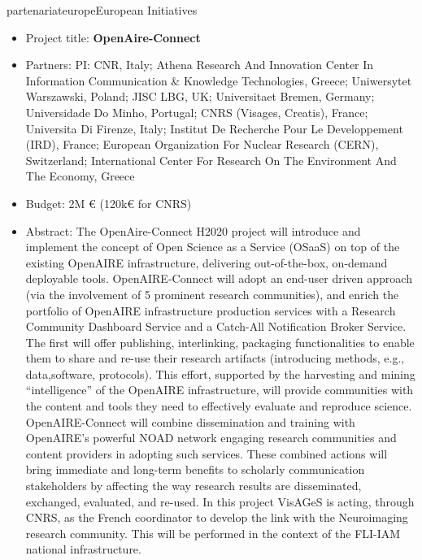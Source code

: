 \documentclass{ra2018}
\begin{document}
\begin{module}{partenariat}{europe}{European Initiatives}
\begin{itemize}
        \item Project title: \textbf{OpenAire-Connect}
        \item Partners: PI: CNR, Italy; Athena Research And Innovation Center In Information Communication \& Knowledge Technologies, Greece; Uniwersytet Warszawski, Poland; JISC LBG, UK; Universitaet Bremen, Germany; Universidade Do Minho, Portugal; CNRS (Visages, Creatis), France; Universita Di Firenze, Italy; Institut De Recherche Pour Le Developpement (IRD), France; European Organization For Nuclear Research (CERN), Switzerland; International Center For Research On The Environment And The Economy, Greece
        \item Budget: 2M € (120k€ for CNRS)
        \item Abstract:  The OpenAire-Connect H2020 project will introduce and implement the concept of Open Science as a Service (OSaaS) on top of the existing OpenAIRE infrastructure, delivering out-of-the-box, on-demand deployable tools. OpenAIRE-Connect will adopt an end-user driven approach (via the involvement of 5 prominent research communities), and enrich the portfolio of OpenAIRE infrastructure production services with a Research Community Dashboard Service and a Catch-All Notification Broker Service. The first will offer publishing, interlinking, packaging functionalities to enable them to share and re-use their research artifacts (introducing methods, e.g., data,software, protocols). This effort, supported by the harvesting and mining “intelligence” of the OpenAIRE infrastructure, will provide communities with the content and tools they need to effectively evaluate and reproduce science. OpenAIRE-Connect will combine dissemination and training with OpenAIRE's powerful NOAD network engaging research communities and content providers in adopting such services. These combined actions will bring immediate and long-term benefits to scholarly communication stakeholders by affecting the way research results are disseminated, exchanged, evaluated, and re-used. In this project VisAGeS is acting, through CNRS, as the French coordinator to develop the link with the Neuroimaging research community. This will be performed in the context of the FLI-IAM national infrastructure.
\end{itemize}


\end{module}
\end{document}
